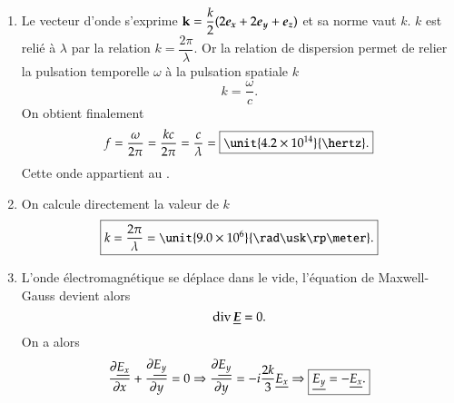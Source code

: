 \begin{corrige}
\begin{enumerate}
	\item Le vecteur d'onde s'exprime $\mathbf{k} = \dfrac{k}{2}
		(2 \ex + 2\ey + \ez)$ et sa norme vaut $k$. $k$ est relié à 
	      $\lambda$ par la relation $k = \dfrac{2 \pi}{\lambda}$. Or la relation 
	      de dispersion permet de relier la pulsation temporelle $\omega$
	      à la pulsation spatiale $k$ 
	      \begin{equation*}
		      k = \dfrac{\omega}{c}.
	      \end{equation*}
	      On obtient finalement
	      \begin{equation*}
		      f = \dfrac{\omega}{2 \pi} = \dfrac{k c}{2 \pi} 
		      = \dfrac{c}{\lambda} = \boxed{\unit{4.2 \times 10^{14}}{\hertz}.}
	      \end{equation*}
	      Cette onde appartient au .
	\item On calcule directement la valeur de $k$ 
	      \begin{equation*}
		      \boxed{
		      k = \dfrac{2 \pi}{\lambda} = \unit{9.0 \times 10^6}{\rad 
		      \usk \rp \meter}.
	      }
      	      \end{equation*}
	\item L'onde électromagnétique se déplace dans le vide, l'équation de 
	     Maxwell-Gauss devient alors
	     \begin{equation*}
		     \div \complex{\vece} = 0.
	     \end{equation*}
	     On a alors
	     \begin{equation*}
		     \dfrac{\partial \underline{E_x}}{\partial x} + \dfrac{\partial \underline{E_y}}{\partial y} = 0 \Rightarrow 
		     \dfrac{\partial \underline{E_y}}{\partial y} = -i \dfrac{2 k}{3} \underline{E_x}
		     \Rightarrow \boxed{\underline{E_y} = -\underline{E_x}.}
	    \end{equation*}


\end{enumerate}
\end{corrige}
